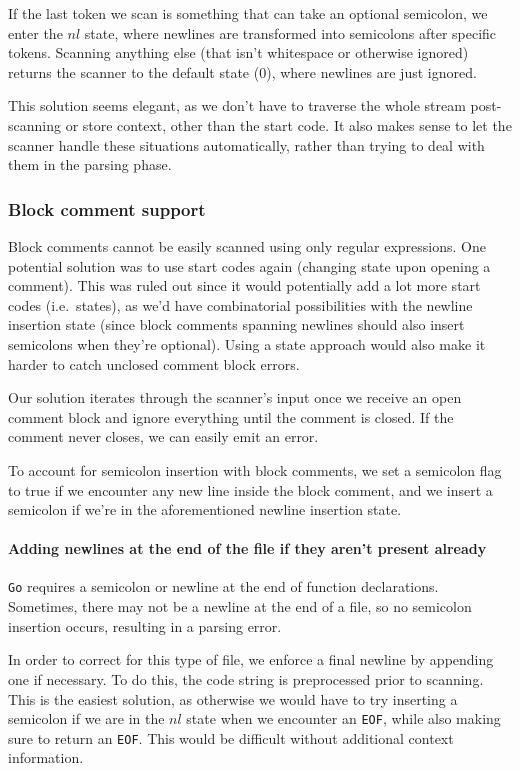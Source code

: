 \documentclass[11pt]{article}
\begin{document}
If the last token we scan is something that can take an optional
semicolon, we enter the \(nl\) state, where newlines are transformed
into semicolons after specific tokens. Scanning anything else (that
isn't whitespace or otherwise ignored) returns the scanner to the
default state (\(0\)), where newlines are just ignored.

This solution seems elegant, as we don't have to traverse the whole
stream post-scanning or store context, other than the start code. It
also makes sense to let the scanner handle these situations
automatically, rather than trying to deal with them in the parsing
phase.
\subsubsection{Block comment support}
Block comments cannot be easily scanned using only regular
expressions. One potential solution was to use start codes again
(changing state upon opening a comment). This was ruled out since it
would potentially add a lot more start codes (i.e.\ states), as we'd
have combinatorial possibilities with the newline insertion state
(since block comments spanning newlines should also insert semicolons
when they're optional). Using a state approach would also make it
harder to catch unclosed comment block errors.

Our solution iterates through the scanner's input once we receive an
open comment block and ignore everything until the comment is closed.
If the comment never closes, we can easily emit an error.

To account for semicolon insertion with block comments, we set a
semicolon flag to true if we encounter any new line inside the block
comment, and we insert a semicolon if we're in the aforementioned
newline insertion state.
\paragraph{Adding newlines at the end of the file if they aren't
  present already}
\texttt{Go} requires a semicolon or newline at the end of function
declarations. Sometimes, there may not be a newline at the end of a
file, so no semicolon insertion occurs, resulting in a parsing error.

In order to correct for this type of file, we enforce a final newline
by appending one if necessary. To do this, the code string is
preprocessed prior to scanning. This is the easiest solution, as
otherwise we would have to try inserting a semicolon if we are in the
\(nl\) state when we encounter an \texttt{EOF}, while also making sure
to return an \texttt{EOF}. This would be difficult without additional
context information.
\end{document}
